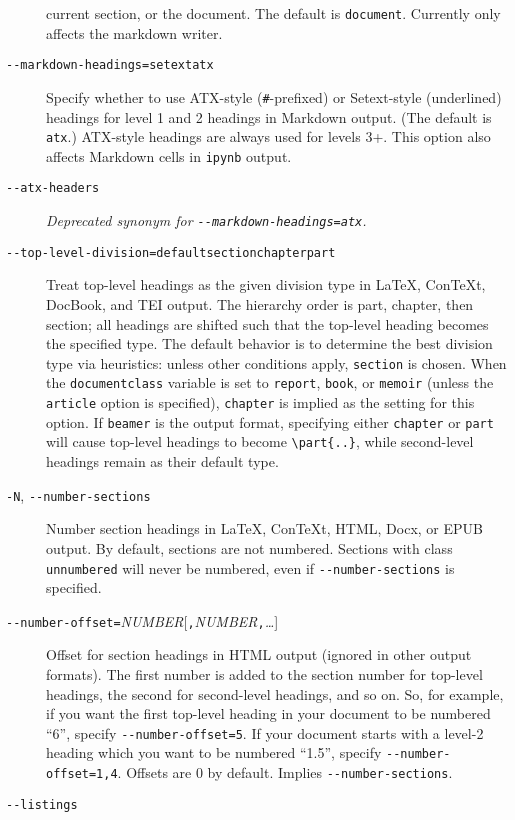 \documentclass[]{article}
\begin{document}
\begin{description}
current section, or the document. The default is \texttt{document}.
Currently only affects the markdown writer.
\item[\texttt{-\/-markdown-headings=setext}\textbar{}\texttt{atx}]
Specify whether to use ATX-style (\texttt{\#}-prefixed) or Setext-style
(underlined) headings for level 1 and 2 headings in Markdown output.
(The default is \texttt{atx}.) ATX-style headings are always used for
levels 3+. This option also affects Markdown cells in \texttt{ipynb}
output.
\item[\texttt{-\/-atx-headers}]
\emph{Deprecated synonym for \texttt{-\/-markdown-headings=atx}.}
\item[\texttt{-\/-top-level-division=default}\textbar{}\texttt{section}\textbar{}\texttt{chapter}\textbar{}\texttt{part}]
Treat top-level headings as the given division type in LaTeX, ConTeXt,
DocBook, and TEI output. The hierarchy order is part, chapter, then
section; all headings are shifted such that the top-level heading
becomes the specified type. The default behavior is to determine the
best division type via heuristics: unless other conditions apply,
\texttt{section} is chosen. When the \texttt{documentclass} variable is
set to \texttt{report}, \texttt{book}, or \texttt{memoir} (unless the
\texttt{article} option is specified), \texttt{chapter} is implied as
the setting for this option. If \texttt{beamer} is the output format,
specifying either \texttt{chapter} or \texttt{part} will cause top-level
headings to become \texttt{\textbackslash{}part\{..\}}, while
second-level headings remain as their default type.
\item[\texttt{-N}, \texttt{-\/-number-sections}]
Number section headings in LaTeX, ConTeXt, HTML, Docx, or EPUB output.
By default, sections are not numbered. Sections with class
\texttt{unnumbered} will never be numbered, even if
\texttt{-\/-number-sections} is specified.
\item[\texttt{-\/-number-offset=}\emph{NUMBER}{[}\texttt{,}\emph{NUMBER}\texttt{,}\emph{\ldots{}}{]}]
Offset for section headings in HTML output (ignored in other output
formats). The first number is added to the section number for top-level
headings, the second for second-level headings, and so on. So, for
example, if you want the first top-level heading in your document to be
numbered ``6'', specify \texttt{-\/-number-offset=5}. If your document
starts with a level-2 heading which you want to be numbered ``1.5'',
specify \texttt{-\/-number-offset=1,4}. Offsets are 0 by default.
Implies \texttt{-\/-number-sections}.
\item[\texttt{-\/-listings}]

\end{description}
\end{document}
